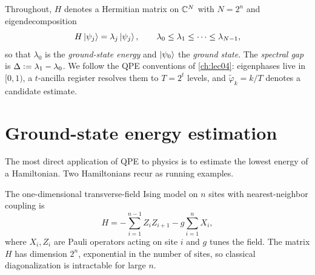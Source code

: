 Throughout, $H$ denotes a Hermitian matrix on $\mathbb{C}^N$ with $N=2^n$ and
eigendecomposition
\[
  H\ket{\psi_j}=\lambda_j\ket{\psi_j},
  \qquad \lambda_0\le\lambda_1\le\cdots\le\lambda_{N-1},
\]
so that $\lambda_0$ is the \emph{ground-state energy} and $\ket{\psi_0}$ the
\emph{ground state}. The \emph{spectral gap} is $\Delta\vcentcolon=\lambda_1-\lambda_0$.
We follow the QPE conventions of \cref{ch:lec04}: eigenphases live in $[0,1)$, a
$t$-ancilla register resolves them to $T=2^t$ levels, and $\tilde\varphi_{k}=k/T$
denotes a candidate estimate.

\section{Ground-state energy estimation}
\label{sec:lec05-1}

The most direct application of QPE to physics is to estimate the lowest energy of
a Hamiltonian. Two Hamiltonians recur as running examples.

\begin{example}
\label{exa:lec05-tfim}
The one-dimensional transverse-field Ising model on $n$ sites with nearest-neighbor
coupling is
\[
  H=-\sum_{i=1}^{n-1} Z_i Z_{i+1}-g\sum_{i=1}^{n} X_i,
\]
where $X_i,Z_i$ are Pauli operators acting on site $i$ and $g$ tunes the field.
The matrix $H$ has dimension $2^n$, exponential in the number of sites, so
classical diagonalization is intractable for large $n$.
\end{example}

